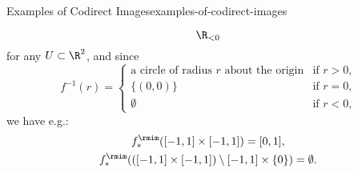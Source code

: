 \begin{example}{Examples of Codirect Images}{examples-of-codirect-images}
\begin{enumerate}
\[                \R_{<0}
            \]%
            for any $U\subset\R^{2}$, and since
            \[
                f^{-1}(r)%
                =
                \begin{cases}
                    \text{a circle of radius $r$ about the origin} &\text{if $r>0$,}\\
                    \{(0,0)\}                                      &\text{if $r=0$,}\\
                    \emptyset                                      &\text{if $r<0$,}
                \end{cases}
            \]%
            we have e.g.:
            \begin{gather*}
                f^{\rmim}_{*}([-1,1]\times[-1,1])                             = [0,1],\\
                f^{\rmim}_{*}(([-1,1]\times[-1,1])\setminus[-1,1]\times\{0\}) = \emptyset.
            \end{gather*}
    \end{enumerate}
\end{example}
